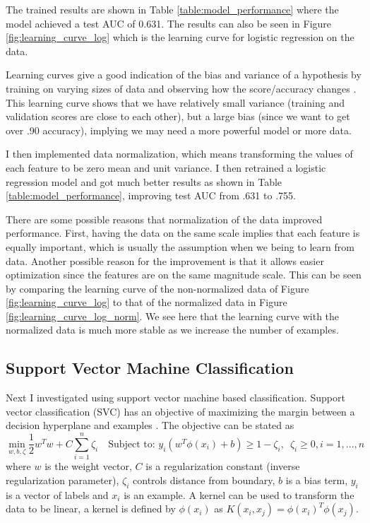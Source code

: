 \documentclass[11pt]{article}
\begin{document}
The trained results are shown in Table \ref{table:model_performance} where the model achieved a test AUC of 0.631.
The results can also be seen in Figure \ref{fig:learning_curve_log} which is the learning curve for logistic regression on the data.

Learning curves give a good indication of the bias and variance of a hypothesis by training on varying sizes of data and observing how the score/accuracy changes \cite{ng_advice_nodate}. 
This learning curve shows that we have relatively small variance (training and validation scores are close to each other), but a large bias (since we want to get over .90 accuracy), implying we may need a more powerful model or more data.

I then implemented data normalization, which means transforming the values of each feature to be zero mean and unit variance.
I then retrained a logistic regression model and got much better results as shown in Table \ref{table:model_performance}, improving test AUC from .631 to .755.

There are some possible reasons that normalization of the data improved performance. 
First, having the data on the same scale implies that each feature is equally important, which is usually the assumption when we being to learn from data.
Another possible reason for the improvement is that it allows easier optimization since the features are on the same magnitude scale.
This can be seen by comparing the learning curve of the non-normalized data of Figure \ref{fig:learning_curve_log} to that of the normalized data in Figure \ref{fig:learning_curve_log_norm}. 
We see here that the learning curve with the normalized data is much more stable as we increase the number of examples.


\subsection*{Support Vector Machine Classification}
Next I investigated using support vector machine based classification. 
Support vector classification (SVC) has an objective of maximizing the margin between a decision hyperplane and examples \cite{noauthor_14_nodate}.
The objective can be stated as 
\[
    \min_ {w, b, \zeta} \frac{1}{2} w^T w + C \sum_{i=1}^{n} \zeta_i
    \quad\text{Subject to: } y_i (w^T \phi (x_i) + b) \geq 1 - \zeta_i,\enspace
    \zeta_i \geq 0, i=1, ..., n
\]
where $w$ is the weight vector, $C$ is a regularization constant (inverse regularization parameter), $\zeta_i$ controls distance from boundary, $b$ is a bias term, $y_i$ is a vector of labels and $x_i$ is an example.
A kernel can be used to transform the data to be linear, a kernel is defined by $\phi (x_i)$ as $K(x_i, x_j) = \phi (x_i)^T \phi (x_j)$.
\end{document}
